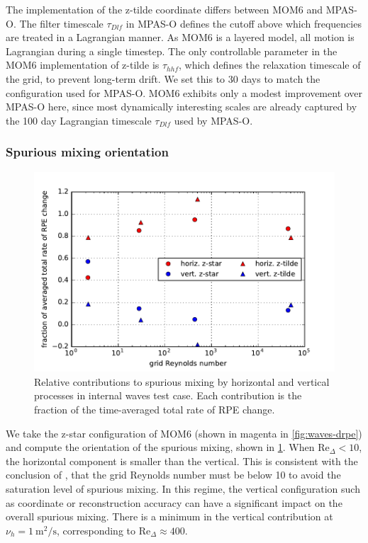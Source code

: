 The implementation of the z-tilde coordinate differs between MOM6 and MPAS-O. The filter timescale $\tau_{Dlf}$ in MPAS-O defines the cutoff above which frequencies are treated in a Lagrangian manner. As MOM6 is a layered model, all motion is Lagrangian during a single timestep. The only controllable parameter in the MOM6 implementation of z-tilde is $\tau_{hhf}$, which defines the relaxation timescale of the grid, to prevent long-term drift. We set this to 30 days to match the configuration used for MPAS-O. MOM6 exhibits only a modest improvement over MPAS-O here, since most dynamically interesting scales are already captured by the 100 day Lagrangian timescale $\tau_{Dlf}$ used by MPAS-O.

\subsubsection{Spurious mixing orientation}

\begin{figure}
  \includegraphics{../plots/internal_waves_drpe_split.pdf}
  \caption{\label{fig:waves-drpesplit} Relative contributions to spurious mixing by horizontal and vertical processes in internal waves test case. Each contribution is the fraction of the time-averaged total rate of RPE change.}
\end{figure}


We take the z-star configuration of MOM6 (shown in magenta in \cref{fig:waves-drpe}) and compute the orientation of the spurious mixing, shown in \cref{fig:waves-drpesplit}. When $\mathrm{Re}_\Delta < 10$, the horizontal component is smaller than the vertical. This is consistent with the conclusion of \citet{ilicak12}, that the grid Reynolds number must be below 10 to avoid the saturation level of spurious mixing. In this regime, the vertical configuration such as coordinate or reconstruction accuracy can have a significant impact on the overall spurious mixing. There is a minimum in the vertical contribution at $\nu_h = \SI{1}{\square\metre\per\second}$, corresponding to $\mathrm{Re}_\Delta \approx 400$.

